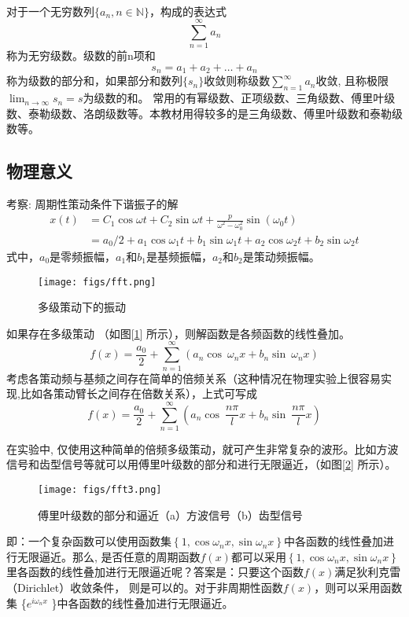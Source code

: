 ~~\\ 
\begin{hint}
	对于一个无穷数列$\{a_n, n \in \mathbb{N}\}$，构成的表达式
	\[\sum_{n=1}^{\infty} a_n\]
	称为无穷级数。级数的前n项和
	\[s_n= a_1 + a_2 +\dots + a_n\]
	称为级数的部分和，如果部分和数列$\{s_n\}$收敛则称级数$ \displaystyle \sum_{n=1}^{\infty} a_n $收敛, 且称极限$\displaystyle \lim_{n \rightarrow \infty} s_n=s$为级数的和。
	常用的有幂级数、正项级数、三角级数、傅里叶级数、泰勒级数、洛朗级数等。本教材用得较多的是三角级数、傅里叶级数和泰勒级数等。
\end{hint}

\subsection{物理意义}
考察: 周期性策动条件下谐振子的解
$$ \begin{aligned}
	x(t) & = C_1 \cos \omega t +C_2 \sin \omega t+ \frac{p}{\omega^2-\omega_{0} ^2 } \sin (\omega_0 t) \\
	& = a_0 /2  + a_1 \cos \omega _1 t +b_1 \sin \omega _1 t + a_2 \cos \omega _2 t +b_2 \sin \omega _2 t
\end{aligned}  $$
式中，$a_0$是零频振幅，$a_1$和$b_1$是基频振幅，$a_2$和$b_2$是策动频振幅。
\begin{figure}[htbp]
	\centering
	\texttt{[image: figs/fft.png]}
	\caption{多级策动下的振动}
	\label{fig:fft}
\end{figure}
如果存在多级策动 （如图[\ref{fig:fft}] 所示），则解函数是各频函数的线性叠加。 
$$ f(x) =\dfrac{a_0}{2} +\sum\limits_{n=1}^{\infty}  \left(  a_n \cos~ \omega_n x +  b_n \sin~ \omega_n x  \right)  $$
考虑各策动频与基频之间存在简单的倍频关系（这种情况在物理实验上很容易实现,比如各策动臂长之间存在倍数关系），上式可写成 
$$ f(x) =\dfrac{a_0}{2} +\sum\limits_{n=1}^{\infty}  \left(  a_n \cos~ \dfrac{n\pi}{l} x +  b_n \sin~ \dfrac{n\pi}{l} x  \right) $$

在实验中, 仅使用这种简单的倍频多级策动，就可产生非常复杂的波形。比如方波信号和齿型信号等就可以用傅里叶级数的部分和进行无限逼近，（如图[\ref{fig:fft3}] 所示）。
\begin{figure}[htbp]
	\centering
	\texttt{[image: figs/fft3.png]}
	\caption{傅里叶级数的部分和逼近（a）方波信号（b）齿型信号}
	\label{fig:fft3}
\end{figure}
即：一个复杂函数可以使用函数集$\left\{1,\cos \omega_n x,\sin \omega_n x \right\}$中各函数的线性叠加进行无限逼近。那么, 是否任意的周期函数$f(x)$都可以采用$\left\{1,\cos \omega_n x,\sin \omega_n x \right\}$里各函数的线性叠加进行无限逼近呢？答案是：只要这个函数$f(x)$满足狄利克雷（Dirichlet）收敛条件， 则是可以的。对于非周期性函数$f(x)$，则可以采用函数集 \{$e^{i \omega_n x} $ \}中各函数的线性叠加进行无限逼近。

